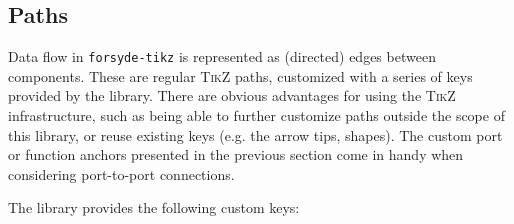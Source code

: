 \documentclass[10pt]{article}
\newcommand\bookmark[1]{\marginpar{\ttfamily #1}}
\begin{document}
\subsection{Paths}

Data flow in \texttt{forsyde-tikz} is represented as (directed) edges between components. These are regular \textsc{TikZ} paths, customized with a series of keys provided by the library. There are obvious advantages for using the \textsc{TikZ} infrastructure, such as being able to further customize paths outside the scope of this library, or reuse existing keys (e.g. the arrow tips, shapes). The custom port or function anchors presented in the previous section come in handy when considering port-to-port connections. 

The library provides the following custom keys:\bookmark{path keys}
\end{document}
